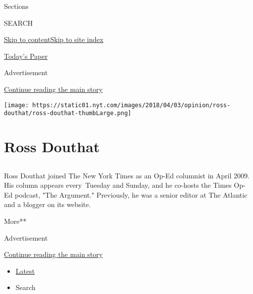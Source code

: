Sections

SEARCH

\protect\hyperlink{site-content}{Skip to
content}\protect\hyperlink{site-index}{Skip to site index}

\href{https://myaccount.nytimes.com/auth/login?response_type=cookie\&client_id=vi}{}

\href{https://www.nytimes.com/section/todayspaper}{Today's Paper}

Advertisement

\protect\hyperlink{after-top}{Continue reading the main story}

\texttt{[image: https://static01.nyt.com/images/2018/04/03/opinion/ross-douthat/ross-douthat-thumbLarge.png]}

\hypertarget{ross-douthat}{%
\section{Ross Douthat}\label{ross-douthat}}

\hypertarget{section}{%
\subsection{}\label{section}}

Ross Douthat joined The New York Times as an Op-Ed columnist in April
2009. His column appears every~Tuesday and Sunday, and he co-hosts the
Times Op-Ed podcast, "The Argument." Previously, he was a senior editor
at The Atlantic and a blogger on its website.~

More**

Advertisement

\protect\hyperlink{after-mid1}{Continue reading the main story}

\begin{itemize}
\tightlist
\item
  \protect\hyperlink{stream-panel}{Latest}
\item
  Search
\end{itemize}

